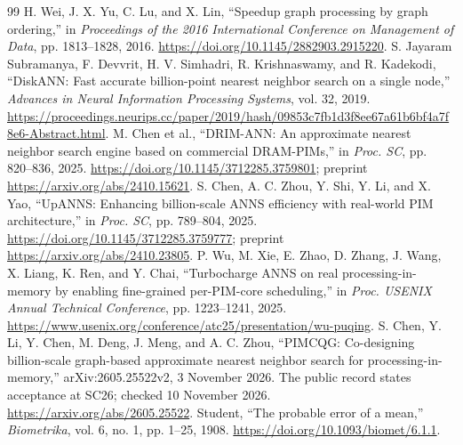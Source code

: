 \begin{thebibliography}{99}
 H. Wei, J. X. Yu, C. Lu, and X. Lin, ``Speedup graph processing by graph ordering,'' in \emph{Proceedings of the 2016 International Conference on Management of Data}, pp. 1813--1828, 2016. \url{https://doi.org/10.1145/2882903.2915220}.
 S. Jayaram Subramanya, F. Devvrit, H. V. Simhadri, R. Krishnaswamy, and R. Kadekodi, ``DiskANN: Fast accurate billion-point nearest neighbor search on a single node,'' \emph{Advances in Neural Information Processing Systems}, vol. 32, 2019. \url{https://proceedings.neurips.cc/paper/2019/hash/09853c7fb1d3f8ee67a61b6bf4a7f8e6-Abstract.html}.
 M. Chen et al., ``DRIM-ANN: An approximate nearest neighbor search engine based on commercial DRAM-PIMs,'' in \emph{Proc. SC}, pp. 820--836, 2025. \url{https://doi.org/10.1145/3712285.3759801}; preprint \url{https://arxiv.org/abs/2410.15621}.
 S. Chen, A. C. Zhou, Y. Shi, Y. Li, and X. Yao, ``UpANNS: Enhancing billion-scale ANNS efficiency with real-world PIM architecture,'' in \emph{Proc. SC}, pp. 789--804, 2025. \url{https://doi.org/10.1145/3712285.3759777}; preprint \url{https://arxiv.org/abs/2410.23805}.
 P. Wu, M. Xie, E. Zhao, D. Zhang, J. Wang, X. Liang, K. Ren, and Y. Chai, ``Turbocharge ANNS on real processing-in-memory by enabling fine-grained per-PIM-core scheduling,'' in \emph{Proc. USENIX Annual Technical Conference}, pp. 1223--1241, 2025. \url{https://www.usenix.org/conference/atc25/presentation/wu-puqing}.
 S. Chen, Y. Li, Y. Chen, M. Deng, J. Meng, and A. C. Zhou, ``PIMCQG: Co-designing billion-scale graph-based approximate nearest neighbor search for processing-in-memory,'' arXiv:2605.25522v2, 3 November 2026. The public record states acceptance at SC26; checked 10 November 2026. \url{https://arxiv.org/abs/2605.25522}.
 Student, ``The probable error of a mean,'' \emph{Biometrika}, vol. 6, no. 1, pp. 1--25, 1908. \url{https://doi.org/10.1093/biomet/6.1.1}.
\end{thebibliography}
